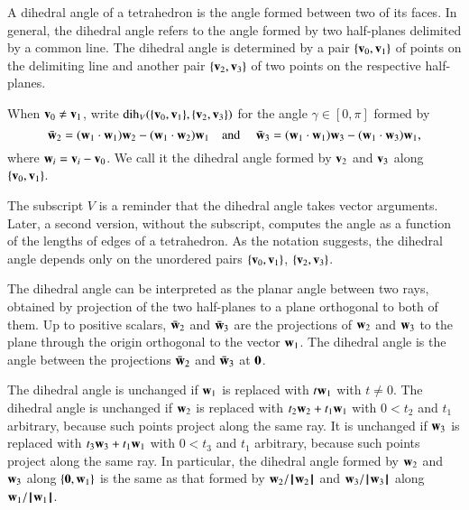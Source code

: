 A dihedral angle of a tetrahedron is the angle formed between two of
its faces. In general, the dihedral angle refers to the angle formed
by two half-planes delimited by a common line.  The dihedral angle is
determined by a pair $\{{\mathbf v}_0,{\mathbf v}_1\}$ of points on the delimiting line
and another pair $\{{\mathbf v}_2,{\mathbf v}_3\}$ of two points on the respective
half-planes.  %
%
%
%
%

\begin{definition}\label{def:dih}
 When ${\mathbf v}_0\ne {\mathbf v}_1$,
  write $\operatorname{dih}_V(\{{\mathbf v}_0,{\mathbf v}_1\},\{{\mathbf v}_2,{\mathbf v}_3\})$ for the angle
  $\gamma\in[0,\pi]$ formed by
\begin{displaymath}
\bar {{\mathbf w}}_2 = ({\mathbf w}_1\cdot {\mathbf w}_1) {\mathbf w}_2 - ({\mathbf w}_1\cdot {\mathbf w}_2) {\mathbf w}_1\quad\text{and }\quad \bar {{\mathbf w}}_3 =
({\mathbf w}_1\cdot {\mathbf w}_1) {\mathbf w}_3 - ({\mathbf w}_1\cdot {\mathbf w}_3) {\mathbf w}_1,
\end{displaymath}
where ${\mathbf w}_i={\mathbf v}_i-{\mathbf v}_0$.  We call it
the dihedral angle formed by ${\mathbf v}_2$ and ${\mathbf v}_3$ along $\{{\mathbf v}_0,{\mathbf v}_1\}$.
%
%
\end{definition}
The subscript $V$ is a reminder 
that the dihedral angle takes vector arguments.
Later, a second version, without the subscript, 
computes the angle as a function of the lengths of edges of a 
tetrahedron.
%
%
As the notation suggests, the dihedral angle depends only
on the unordered pairs $\{{\mathbf v}_0,{\mathbf v}_1\}$, $\{{\mathbf v}_2,{\mathbf v}_3\}$.

The dihedral angle can be interpreted as the planar angle between two rays, obtained by
projection of the two half-planes to a plane orthogonal to both of
them.  Up to positive scalars, $\bar {{\mathbf w}}_2$ and $\bar {{\mathbf w}}_3$ are the
projections of ${\mathbf w}_2$ and ${\mathbf w}_3$ to the plane through the origin
orthogonal to the vector ${\mathbf w}_1$.  The dihedral angle is the angle
between the projections $\bar {{\mathbf w}}_2$ and $\bar {{\mathbf w}}_3$ at ${\mathbf 0}$.

\begin{remark}\label{rem:dih}
  The dihedral angle is unchanged if ${\mathbf w}_1$ is replaced with $t {\mathbf w}_1$ with
  $t\ne0$. The dihedral angle is unchanged if ${\mathbf w}_2$ is replaced with
  $t_2 {\mathbf w}_2 + t_1 {\mathbf w}_1$ with $0 < t_2$ and $t_1$ arbitrary, because
  such points project along the same ray.  It is unchanged if ${\mathbf w}_3$ is
  replaced with $t_3 {\mathbf w}_3 + t_1 {\mathbf w}_1$ with $0 < t_3$ and $t_1$
  arbitrary, because such points project along the same ray.  In
  particular, the dihedral angle formed by ${\mathbf w}_2$ and ${\mathbf w}_3$ along
  $\{{\mathbf 0},{\mathbf w}_1\}$ is the same as that formed by ${\mathbf w}_2/{{\hskip0.1em|\hskip-0.15em|\hskip0.1em}{\mathbf w}_2{\hskip0.1em|\hskip-0.15em|\hskip0.1em}}$ and
  ${\mathbf w}_3/{{\hskip0.1em|\hskip-0.15em|\hskip0.1em}{\mathbf w}_3{\hskip0.1em|\hskip-0.15em|\hskip0.1em}}$ along ${\mathbf w}_1/{{\hskip0.1em|\hskip-0.15em|\hskip0.1em}{\mathbf w}_1{\hskip0.1em|\hskip-0.15em|\hskip0.1em}}$.
\end{remark}

